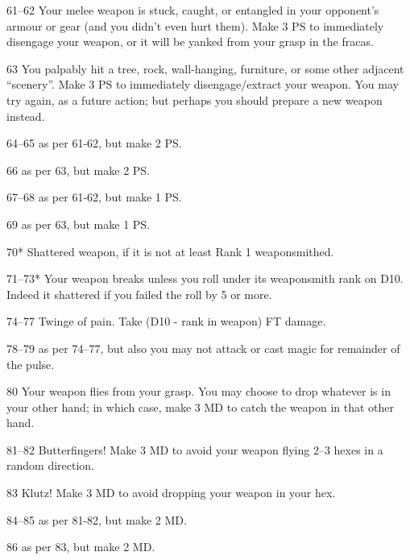 \begin{multicols*}{3}
\begin{Description}
\item[61--62] Your melee weapon is stuck, caught, or entangled in your
opponent's armour or gear (and you didn't even hurt them). Make 3 \x PS
to immediately disengage your weapon, or it will be yanked from your
grasp in the fracas.

\item[63] You palpably hit a tree, rock, wall-hanging, furniture, or
some other adjacent ``scenery''. Make 3 \x PS to immediately
disengage/extract your weapon. You may try again, as a future action;
but perhaps you should prepare a new weapon instead.

\item[64--65] as per 61-62, but make 2 \x PS.

\item[66] as per 63, but make 2 \x PS.

\item[67--68] as per 61-62, but make 1 \x PS.

\item[69] as per 63, but make 1 \x PS.

\item[70*] Shattered weapon, if it is not at least Rank 1 weaponsmithed.

\item[71--73*] Your weapon breaks unless you roll under its
weaponsmith rank on D10. Indeed it shattered if you failed the roll by
5 or more.

\item[74--77] Twinge of pain. Take (D10 - rank in weapon) FT damage.

\item[78--79] as per 74--77, but also you may not attack or cast magic
for remainder of the pulse.

\item[80] Your weapon flies from your grasp. You may choose to drop
whatever is in your other hand; in which case, make 3 \x MD to catch
the weapon in that other hand.

\item[81--82] Butterfingers! Make 3 \x MD to avoid your weapon flying
2--3 hexes in a random direction.

\item[83] Klutz! Make 3 \x MD to avoid dropping your weapon in your hex.

\item[84--85] as per 81-82, but make 2 \x MD.

\item[86] as per 83, but make 2 \x MD.


\end{Description}
\end{multicols*}

